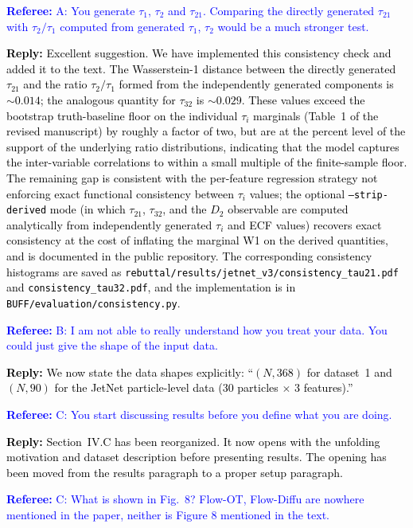 \documentclass[11pt]{article}
\newcommand{\refcomment}[1]{\textcolor{blue}{\textbf{Referee:} #1}}
\newcommand{\reply}[1]{\textcolor{black}{\textbf{Reply:} #1}}
\begin{document}
\refcomment{A: You generate $\tau_1$, $\tau_2$ and $\tau_{21}$. Comparing the directly generated $\tau_{21}$ with $\tau_2/\tau_1$ computed from generated $\tau_1$, $\tau_2$ would be a much stronger test.}

\reply{Excellent suggestion. We have implemented this consistency check and added it to the text. The Wasserstein-1 distance between the directly generated $\tau_{21}$ and the ratio $\tau_2/\tau_1$ formed from the independently generated components is $\sim 0.014$; the analogous quantity for $\tau_{32}$ is $\sim 0.029$. These values exceed the bootstrap truth-baseline floor on the individual $\tau_i$ marginals (Table~1 of the revised manuscript) by roughly a factor of two, but are at the percent level of the support of the underlying ratio distributions, indicating that the model captures the inter-variable correlations to within a small multiple of the finite-sample floor.  The remaining gap is consistent with the per-feature regression strategy not enforcing exact functional consistency between $\tau_i$ values; the optional \texttt{--strip-derived} mode (in which $\tau_{21}$, $\tau_{32}$, and the $D_2$ observable are computed analytically from independently generated $\tau_i$ and ECF values) recovers exact consistency at the cost of inflating the marginal W1 on the derived quantities, and is documented in the public repository. The corresponding consistency histograms are saved as \texttt{rebuttal/results/jetnet\_v3/consistency\_tau21.pdf} and \texttt{consistency\_tau32.pdf}, and the implementation is in \texttt{BUFF/evaluation/consistency.py}.}

\bigskip

\refcomment{B: I am not able to really understand how you treat your data. You could just give the shape of the input data.}

\reply{We now state the data shapes explicitly: ``$(N, 368)$ for dataset~1 and $(N, 90)$ for the JetNet particle-level data (30 particles $\times$ 3 features).''}

\bigskip

\refcomment{C: You start discussing results before you define what you are doing.}

\reply{Section~IV.C has been reorganized. It now opens with the unfolding motivation and dataset description before presenting results. The opening has been moved from the results paragraph to a proper setup paragraph.}

\bigskip

\refcomment{C: What is shown in Fig.~8? Flow-OT, Flow-Diffu are nowhere mentioned in the paper, neither is Figure 8 mentioned in the text.}
\end{document}
